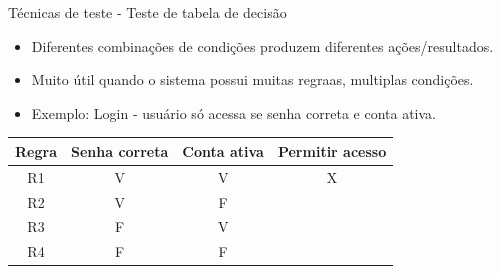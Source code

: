 
\begin{frame}{Técnicas de teste - Teste de tabela de decisão}
    \begin{itemize}
        \item Diferentes combinações de condições produzem diferentes ações/resultados.
        \item Muito útil quando o sistema possui muitas regraas, multiplas condições.
        \item Exemplo: Login - usuário só acessa se senha correta e conta ativa.
    \end{itemize}

    \begin{table}[h]
    \centering
    \begin{tabular}{|c|c|c|c|}
    \hline
    \textbf{Regra} & \textbf{Senha correta} & \textbf{Conta ativa} & \textbf{Permitir acesso} \\
    \hline
    R1 & V & V & X \\
    \hline
    R2 & V & F & \\
    \hline
    R3 & F & V & \\
    \hline
    R4 & F & F & \\
    \hline
    \end{tabular}
    \end{table}
\end{frame}